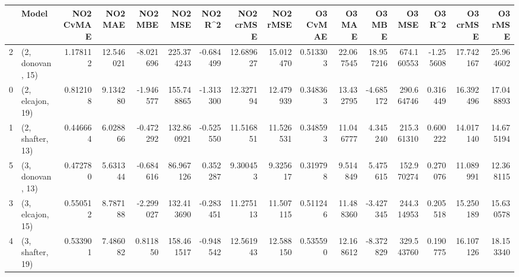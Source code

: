 \begin{tabular}{llrrrrrrrrrrrrrr}
\toprule
{} &             Model &  NO2 CvMAE &    NO2 MAE &   NO2 MBE &     NO2 MSE &   NO2 R\textasciicircum2 &  NO2 crMSE &   NO2 rMSE &  O3 CvMAE &     O3 MAE &     O3 MBE &      O3 MSE &    O3 R\textasciicircum2 &   O3 crMSE &    O3 rMSE \\
\midrule
2 &  (2, donovan, 15) &   1.178112 &  12.546021 & -8.021696 &  225.374243 & -0.684499 &  12.689627 &  15.012470 &  0.513303 &  22.067545 &  18.957216 &  674.160553 & -1.255608 &  17.742167 &  25.964602 \\
0 &  (2, elcajon, 19) &   0.812108 &   9.134280 & -1.946577 &  155.748865 & -1.313300 &  12.327194 &  12.479939 &  0.348363 &  13.432795 &  -4.685172 &  290.664746 &  0.316449 &  16.392496 &  17.048893 \\
1 &  (2, shafter, 13) &   0.446664 &   6.028866 & -0.472292 &  132.860921 & -0.525550 &  11.516851 &  11.526531 &  0.348593 &  11.046777 &   4.345240 &  215.361310 &  0.600222 &  14.017140 &  14.675194 \\
5 &  (3, donovan, 13) &   0.472780 &   5.631344 & -0.684616 &   86.967126 &  0.352287 &   9.300453 &   9.325617 &  0.319798 &   9.514849 &   5.475615 &  152.970274 &  0.270076 &  11.089991 &  12.368115 \\
3 &  (3, elcajon, 15) &   0.550512 &   8.787188 & -2.299027 &  132.413690 & -0.283451 &  11.275113 &  11.507115 &  0.511246 &  11.488360 &  -3.427345 &  244.314953 &  0.205518 &  15.250189 &  15.630578 \\
4 &  (3, shafter, 19) &   0.533901 &   7.486082 &  0.811850 &  158.461517 & -0.948542 &  12.561943 &  12.588150 &  0.535590 &  12.168612 &  -8.372829 &  329.543760 &  0.190775 &  16.107126 &  18.153340 \\
\bottomrule
\end{tabular}
